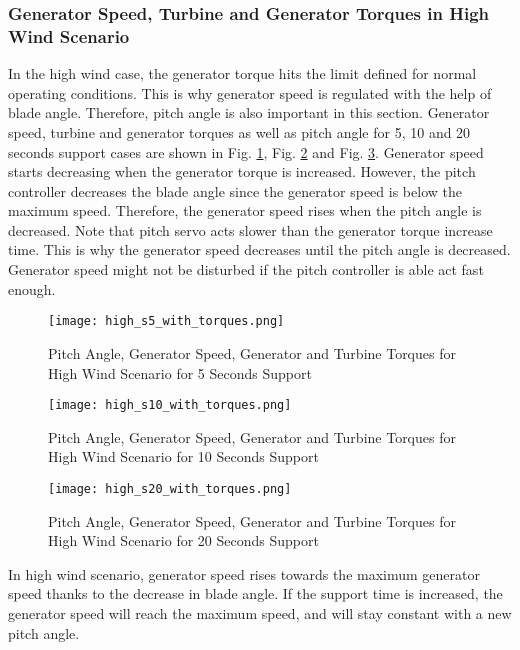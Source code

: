 \subsubsection{Generator Speed, Turbine and Generator Torques in High Wind Scenario}
In the high wind case, the generator torque hits the limit defined for normal operating conditions. This is why generator speed is regulated with the help of blade angle. Therefore, pitch angle is also important in this section. Generator speed, turbine and generator torques as well as pitch angle for 5, 10 and 20 seconds support cases are shown in Fig. \ref{high_s5}, Fig. \ref{high_s10} and Fig. \ref{high_s20}. Generator speed starts decreasing when the generator torque is increased. However, the pitch controller decreases the blade angle since the generator speed is below the maximum speed. Therefore, the generator speed rises when the pitch angle is decreased. Note that pitch servo acts slower than the generator torque increase time. This is why the generator speed decreases until the pitch angle is decreased. Generator speed might not be disturbed if the pitch controller is able act fast enough.\par
\begin{figure}[h!]
	\centering
	\texttt{[image: high\_s5\_with\_torques.png]}
	\caption{Pitch Angle, Generator Speed, Generator and Turbine Torques for High Wind Scenario for 5 Seconds Support}
	\label{high_s5}
\end{figure}
\begin{figure}[h!]
	\centering
	\texttt{[image: high\_s10\_with\_torques.png]}
	\caption{Pitch Angle, Generator Speed, Generator and Turbine Torques for High Wind Scenario for 10 Seconds Support}
	\label{high_s10}
\end{figure}
\begin{figure}[h!]
	\centering
	\texttt{[image: high\_s20\_with\_torques.png]}
	\caption{Pitch Angle, Generator Speed, Generator and Turbine Torques for High Wind Scenario for 20 Seconds Support}
	\label{high_s20}
\end{figure}
In high wind scenario, generator speed rises towards the maximum generator speed thanks to the decrease in blade angle. If the support time is increased, the generator speed will reach the maximum speed, and will stay constant with a new pitch angle. 
